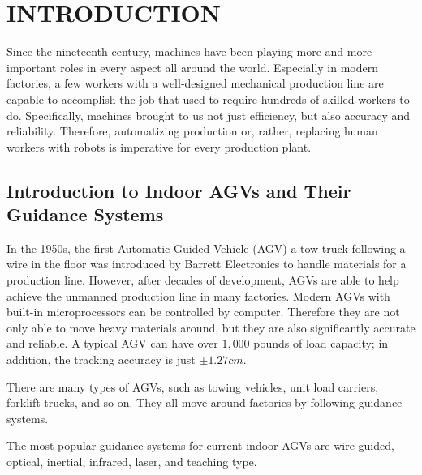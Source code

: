 %
%
%


\chapter{INTRODUCTION}

Since the nineteenth century, machines have been playing more and more important roles in every aspect all around the world. Especially in modern factories, a few workers with a well-designed mechanical production line are capable to accomplish the job that used to require hundreds of skilled workers to do. Specifically, machines brought to us not just efficiency, but also accuracy and reliability. Therefore, automatizing production or, rather, replacing human workers with robots is imperative for every production plant.


\section{Introduction to Indoor AGVs and Their Guidance Systems}

In the 1950s, the first Automatic Guided Vehicle (AGV) a tow truck following a wire in the floor was introduced by Barrett Electronics to handle materials for a production line. \cite{olmi2011traffic} However, after decades of development, AGVs are able to help achieve the unmanned production line in many factories. Modern AGVs with built-in microprocessors can be controlled by computer. Therefore they are not only able to move heavy materials around, but they are also significantly accurate and reliable. A typical AGV can have over $1,000$ pounds of load capacity; in addition, the tracking accuracy is just $\pm 1.27 cm$. \cite{KESH} 
		
There are many types of AGVs, such as towing vehicles, unit load carriers, forklift trucks, and so on. They all move around factories by following guidance systems.  
		
The most popular guidance systems for current indoor AGVs are wire-guided, optical, inertial, infrared, laser, and teaching type. \cite{KESH}

